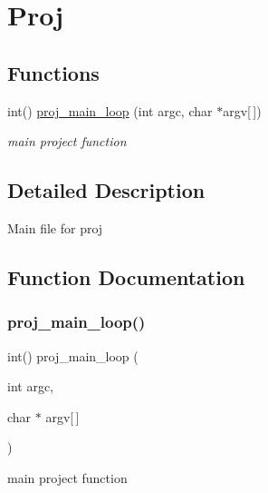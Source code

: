 \hypertarget{group__Proj}{}\section{Proj}
\label{group__Proj}
\subsection*{Functions}
\begin{DoxyCompactItemize}
\item 
int() \hyperlink{group__Proj_ga2a16f651eccbd248e1ad3b3b924b143b}{proj\+\_\+main\+\_\+loop} (int argc, char $\ast$argv\mbox{[}$\,$\mbox{]})
\begin{DoxyCompactList}\small\item\em main project function \end{DoxyCompactList}\end{DoxyCompactItemize}


\subsection{Detailed Description}
Main file for proj 

\subsection{Function Documentation}
\mbox{\label{group__Proj_ga2a16f651eccbd248e1ad3b3b924b143b}} 
\subsubsection{\texorpdfstring{proj\+\_\+main\+\_\+loop()}{proj\_main\_loop()}}
{\footnotesize\ttfamily int() proj\+\_\+main\+\_\+loop (\begin{DoxyParamCaption}\item[{int}]{argc,  }\item[{char $\ast$}]{argv\mbox{[}$\,$\mbox{]} }\end{DoxyParamCaption})}



main project function 


